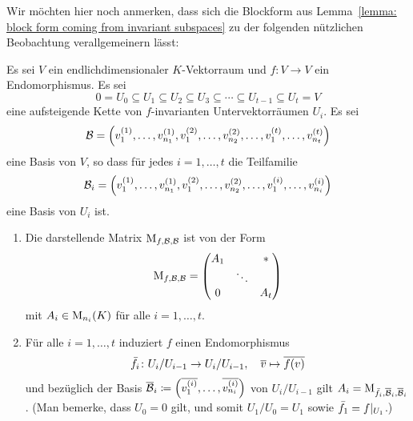 Wir möchten hier noch anmerken, dass sich die Blockform aus Lemma~\ref{lemma: block form coming from invariant subspaces} zu der folgenden nützlichen Beobachtung verallgemeinern lässt:

\begin{proposition}
  \label{proposition: better block form coming from chain of invariant subspaces}
  Es sei $V$ ein endlichdimensionaler $K$-Vektorraum und $f \colon V \to V$ ein Endomorphismus.
  Es sei
  \[
              0
    =         U_0
    \subseteq U_1
    \subseteq U_2
    \subseteq U_3
    \subseteq \dotsb
    \subseteq U_{t-1}
    \subseteq U_t
    =         V
  \]
  eine aufsteigende Kette von $f$-invarianten Untervektorräumen $U_i$.
  Es sei
  \[
      \mathcal{B}
    = \left(
        v^{(1)}_1, \dotsc, v^{(1)}_{n_1},
        v^{(2)}_1, \dotsc, v^{(2)}_{n_2},
        \dotsc,
        v^{(t)}_1, \dotsc, v^{(t)}_{n_t}
      \right)
  \]
  eine Basis von $V$, so dass für jedes $i = 1, \dotsc, t$ die Teilfamilie
  \[
      \mathcal{B}_i
    = \left(
        v^{(1)}_1, \dotsc, v^{(1)}_{n_1},
        v^{(2)}_1, \dotsc, v^{(2)}_{n_2},
        \dotsc,
        v^{(i)}_1, \dotsc, v^{(i)}_{n_i}
      \right)
  \]
  eine Basis von $U_i$ ist.
  \begin{enumerate}
    \item
      Die darstellende Matrix $\operatorname{M}_{f, \mathcal{B}, \mathcal{B}}$ ist von der Form
      \begin{equation}
        \label{equation: general block matrix}
          \operatorname{M}_{f, \mathcal{B}, \mathcal{B}}
        = \begin{pmatrix}
            A_1 &         & *
            \\
                & \ddots  &
            \\
            0   &         & A_t
          \end{pmatrix}
      \end{equation}
      mit $A_i \in \operatorname{M}_{n_i}(K)$ für alle $i = 1, \dotsc, t$.
    \item
      Für alle $i = 1, \dotsc, t$ induziert $f$ einen Endomorphismus
      \[
                \bar{f}_i
        \colon  U_i/U_{i-1} \to U_i/U_{i-1},
        \quad   \overline{v}
        \mapsto \overline{f(v)}
      \]
      und bezüglich der Basis $\overline{\mathcal{B}}_i \coloneqq \left( \overline{v^{(i)}_1}, \dotsc, \overline{v^{(i)}_{n_i}} \right)$ von $U_i/U_{i-1}$ gilt $A_i = \operatorname{M}_{\bar{f}_i, \overline{\mathcal{B}}_i, \overline{\mathcal{B}}_i}$.
      (Man bemerke, dass $U_0 = 0$ gilt, und somit $U_1/U_0 = U_1$ sowie $\bar{f}_1 = f|_{U_1}$.)
  \end{enumerate}
\end{proposition}

